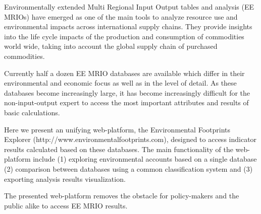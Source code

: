 Environmentally extended Multi Regional Input Output tables and analysis (EE MRIOs) have emerged as one of the main tools to analyze resource use and environmental impacts across international supply chains. They provide insights into the life cycle impacts of the production and consumption of commodities world wide, taking into account the global supply chain of purchased commodities.

Currently half a dozen EE MRIO databases are available which differ in their environmental and economic focus as well as in the level of detail. As these databases become increasingly large, it has become increasingly difficult for the non-input-output expert to access the most important attributes and results of basic calculations.

Here we present an unifying web-platform, the Environmental Footprints Explorer (http://www.environmentalfootprints.com), designed to access indicator results calculated based on these databases. The main functionality of the web-platform include (1) exploring environmental accounts based on a single database (2) comparison between databases using a common classification system and (3) exporting analysis results visualization.

The presented web-platform removes the obstacle for policy-makers and the public alike to access EE MRIO results. 

